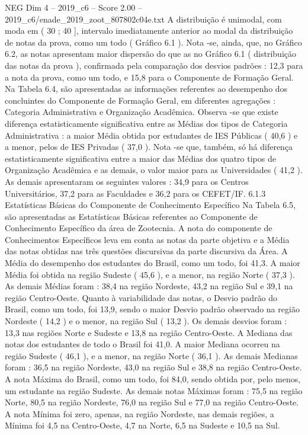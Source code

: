 \begin{textsample}{NEG Dim 4 – 2019\_c6 – Score 2.00 – 2019\_c6/enade\_2019\_zoot\_807802c04e.txt}
A distribuição é unimodal, com moda em ( 30 ; 40 ], intervalo imediatamente anterior ao modal da distribuição de notas da prova, como um todo ( Gráfico 6.1 ).
Nota -se, ainda, que, no Gráfico 6.2, as notas apresentam maior dispersão do que as no Gráfico 6.1 ( distribuição das notas da prova ), confirmada pela comparação dos desvios padrões : 12,3 para a nota da prova, como um todo, e 15,8 para o Componente de Formação Geral.
Na Tabela 6.4, são apresentadas as informações referentes ao desempenho dos concluintes do Componente de Formação Geral, em diferentes agregações : Categoria Administrativa e Organização Acadêmica.
Observa -se que existe diferença estatisticamente significativa entre as Médias dos tipos de Categoria Administrativa : a maior Média obtida por estudantes de IES Públicas ( 40,6 ) e a menor, pelos de IES Privadas ( 37,0 ).
Nota -se que, também, só há diferença estatisticamente significativa entre a maior das Médias dos quatro tipos de Organização Acadêmica e as demais, o valor maior para as Universidades ( 41,2 ).
As demais apresentaram os seguintes valores : 34,9 para os Centros Universitários, 37,2 para as Faculdades e 36,2 para os CEFET/IF. 6.1.3 Estatísticas Básicas do Componente de Conhecimento Específico Na Tabela 6.5, são apresentadas as Estatísticas Básicas referentes ao Componente de Conhecimento Específico da área de Zootecnia.
A nota do componente de Conhecimentos Específicos leva em conta as notas da parte objetiva e a Média das notas obtidas nas três questões discursivas da parte discursiva da Área.
A Média do desempenho dos estudantes do Brasil, como um todo, foi 41,3.
A maior Média foi obtida na região Sudeste ( 45,6 ), e a menor, na região Norte ( 37,3 ).
As demais Médias foram : 38,4 na região Nordeste, 43,2 na região Sul e 39,1 na região Centro-Oeste.
Quanto à variabilidade das notas, o Desvio padrão do Brasil, como um todo, foi 13,9, sendo o maior Desvio padrão observado na região Nordeste ( 14,2 ) e o menor, na região Sul ( 13,2 ).
Os demais desvios foram : 13,3 nas regiões Norte e Sudeste e 13,8 na região Centro-Oeste.
A Mediana das notas dos estudantes de todo o Brasil foi 41,0.
A maior Mediana ocorreu na região Sudeste ( 46,1 ), e a menor, na região Norte ( 36,1 ).
As demais Medianas foram : 36,5 na região Nordeste, 43,0 na região Sul e 38,8 na região Centro-Oeste.
A nota Máxima do Brasil, como um todo, foi 84,0, sendo obtida por, pelo menos, um estudante na região Sudeste.
As demais notas Máximas foram : 75,5 na região Norte, 80,5 na região Nordeste, 76,0 na região Sul e 77,0 na região Centro-Oeste.
A nota Mínima foi zero, apenas, na região Nordeste, nas demais regiões, a Mínima foi 4,5 na Centro-Oeste, 4,7 na Norte, 6,5 na Sudeste e 10,5 na Sul.

\end{textsample}
